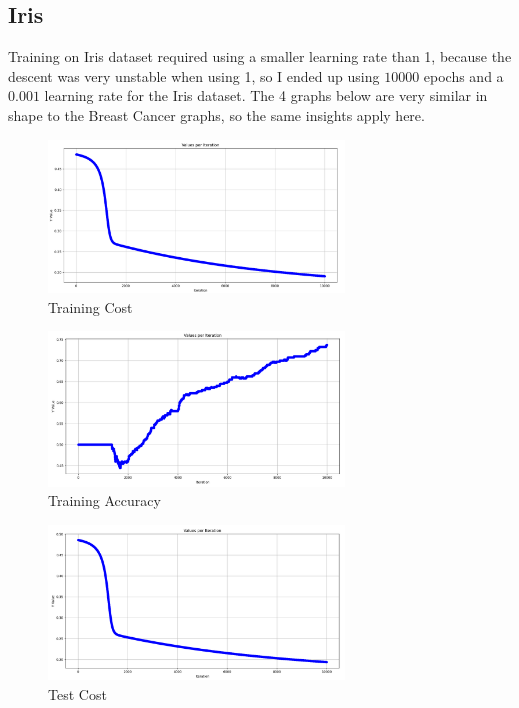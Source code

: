 \documentclass{article}
\begin{document}
        \subsection*{Iris}
            Training on Iris dataset required using a smaller learning rate than 1, because the descent was very unstable when using 1, so I ended up using $10000$ epochs and a $0.001$ learning rate for the Iris dataset. The 4 graphs below are very similar in shape to the Breast Cancer graphs, so the same insights apply here. 
            \begin{figure}[H]
                \centering
                \includegraphics[width=0.7\textwidth]{iris-train-cost.png}
                \caption{Training Cost}
            \end{figure}
            \begin{figure}[H]
                \centering
                \includegraphics[width=0.7\textwidth]{iris-train-acc.png}
                \caption{Training Accuracy}
            \end{figure}
            \begin{figure}[H]
                \centering
                \includegraphics[width=0.7\textwidth]{iris-test-cost.png}
                \caption{Test Cost}
                \label{fig:training-loop}
            \end{figure}
\end{document}
